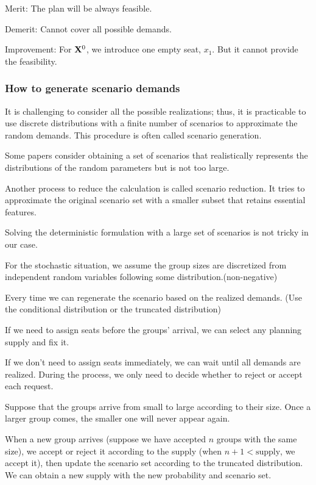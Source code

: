 
Merit: The plan will be always feasible.

Demerit: Cannot cover all possible demands.

Improvement:
For $\mathbf{X}^{0}$, we introduce one empty seat, $x_1$. But it cannot provide the feasibility.

\subsubsection{How to generate scenario demands}
It is challenging to consider all the possible realizations; thus, it is practicable to use discrete distributions with a finite number of scenarios to approximate the random demands. This procedure is often called scenario generation.

Some papers consider obtaining a set of scenarios that realistically represents the distributions of the random parameters but is not too large. \cite{feng2013scenario} \cite{casey2005scenario}
\cite{henrion2018problem}

Another process to reduce the calculation is called scenario reduction. It tries to approximate the original scenario set with a smaller subset that retains essential features.

Solving the deterministic formulation with a large set of scenarios is not tricky in our case.

For the stochastic situation, we assume the group sizes are discretized from independent random variables following some distribution.(non-negative)

Every time we can regenerate the scenario based on the realized demands. (Use the conditional distribution or the truncated distribution)

If we need to assign seats before the groups' arrival, we can select any planning supply and fix it. 

If we don't need to assign seats immediately, we can wait until all demands are realized. During the process, we only need to decide whether to reject or accept each request.

Suppose that the groups arrive from small to large according to their size. Once a larger group comes, the smaller one will never appear again.

When a new group arrives (suppose we have accepted $n$ groups with the same size), we accept or reject it according to the supply (when $n+1 < \text{supply}$, we accept it), then update the scenario set according to the truncated distribution. We can obtain a new supply with the new probability and scenario set.

